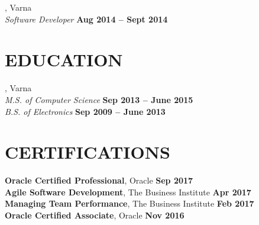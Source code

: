 \documentclass[margin,line]{resume}
\begin{document}
\begin{resume}
\pagebreak

    \textbf{}, Varna \vspace{2mm}\\\vspace{1mm}%
    \textsl{Software Developer} \hfill \textbf{Aug 2014 {--} Sept 2014}

\sectionline%

    \section{\mysidestyle\textbf{\large{E}\small{DUCATION}}}

    \textbf{}, Varna \vspace{2mm}\\\vspace{1mm}%
    \textsl{M.S. of Computer Science} \hfill \textbf{ Sep 2013 {--} June 2015}\\
    \textsl{B.S. of Electronics} \hfill \textbf{ Sep 2009 {--} June 2013}\\

\sectionline%

    \section{\mysidestyle\textbf{\large{C}\small{ERTIFICATIONS}}}

    \textbf{Oracle Certified Professional}, Oracle \hfill \textbf{Sep 2017} \vspace{2mm}\\\vspace{1mm}%
    \textbf{Agile Software Development}, The Business Institute \hfill \textbf{Apr 2017} \vspace{2mm}\\\vspace{1mm}%
    \textbf{Managing Team Performance}, The Business Institute \hfill \textbf{Feb 2017} \vspace{2mm}\\\vspace{1mm}%
    \textbf{Oracle Certified Associate}, Oracle \hfill \textbf{Nov 2016} \vspace{2mm}\\\vspace{1mm}%

\end{resume}
\end{document}
